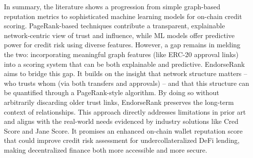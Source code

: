 In summary, the literature shows a progression from simple graph-based reputation metrics to sophisticated machine learning models for on-chain credit scoring. PageRank-based techniques contribute a transparent, explainable network-centric view of trust and influence, while ML models offer predictive power for credit risk using diverse features. However, a gap remains in melding the two: incorporating meaningful graph features (like ERC-20 approval links) into a scoring system that can be both explainable and predictive. EndorseRank aims to bridge this gap. It builds on the insight that network structure matters -- who trusts whom (via both transfers and approvals) -- and that this structure can be quantified through a PageRank-style algorithm. By doing so without arbitrarily discarding older trust links, EndorseRank preserves the long-term context of relationships. This approach directly addresses limitations in prior art and aligns with the real-world needs evidenced by industry solutions like Cred Score and Jane Score. It promises an enhanced on-chain wallet reputation score that could improve credit risk assessment for undercollateralized DeFi lending, making decentralized finance both more accessible and more secure.
